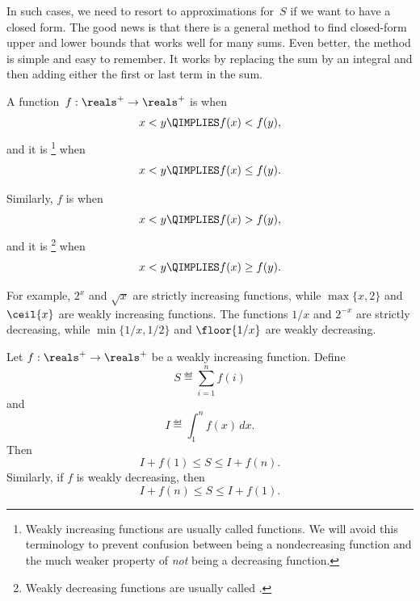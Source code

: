 In such cases, we need to resort to approximations for~$S$ if we want
to have a closed form.  The good news is that there is a general
method to find closed-form upper and lower bounds that works well for
many sums.  Even better, the method is simple and easy to remember.
It works by replacing the sum by an integral and then adding either
the first or last term in the sum.

\begin{definition}\label{weakly_increasing_function_def}
A function~$f: \reals^+ \to \reals^+$
is  when
\[
x < y \QIMPLIES f(x) < f(y),
\]
and it is \footnote{Weakly increasing
  functions are usually called  functions.  We
  will avoid this terminology to prevent confusion between being a
  nondecreasing function and the much weaker property
  of \emph{not} being a decreasing function.} when
\[
x < y \QIMPLIES f(x) \le f(y).
\]

Similarly, $f$ is  when
\[
x < y \QIMPLIES f(x) > f(y),
\]
and it is \footnote{Weakly decreasing
  functions are usually called .}  when
\[
x < y \QIMPLIES f(x) \ge f(y).
\]
\end{definition}

For example, $2^x$ and $\sqrt{x}$ are strictly increasing functions,
while $\max\{x,2\}$ and $\ceil{x}$ are weakly increasing functions.  The
functions $1/x$ and $2^{-x}$ are strictly decreasing, while $\min\{1/x,
  1/2\}$ and $\floor{1/x}$ are weakly decreasing.

\begin{theorem}\label{weak_increasing_sum_bounds}  %
Let $f: \reals^+ \to \reals^+$ be a weakly increasing function.
Define
\begin{equation}\label{Sdefsumf}
    S \eqdef \sum_{i = 1}^n f(i)
\end{equation}
and
\[
    I \eqdef \int_1^n f(x)\, dx.
\]
Then
\begin{equation}\label{If1lS}
    I + f(1) \le S \le I + f(n).
\end{equation}
Similarly, if $f$ is weakly decreasing, then
\[
    I + f(n) \le S \le I + f(1).
\]
\end{theorem}

